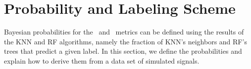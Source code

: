 \section{Probability and Labeling Scheme} \label{probability}

Bayesian probabilities for the \hasns\ and \hasrem\ metrics can be defined using the results of the \ac{KNN} and \ac{RF} algorithms, namely the fraction of \ac{KNN}'s neighbors and
\ac{RF}'s trees that predict a given label. In this section, we define the probabilities and explain how to derive them from a data set of simulated signals.  







